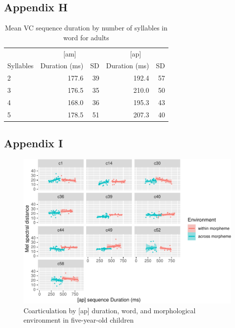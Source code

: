 \documentclass[
]{article}
\begin{document}
\hypertarget{appendix-h}{%
\subsection{Appendix H}\label{appendix-h}}

\begin{table}

\caption{\label{tab:dur-by-syll-adults}Mean VC sequence duration by number of syllables in word for adults}
\centering
\begin{tabular}[t]{lrrrr}
\toprule
\multicolumn{1}{c}{ } & \multicolumn{2}{c}{[am]} & \multicolumn{2}{c}{[ap]} \\
\cmidrule(l{3pt}r{3pt}){2-3} \cmidrule(l{3pt}r{3pt}){4-5}
Syllables & Duration (ms) & SD  & Duration (ms) & SD\\
\midrule
2 & 177.6 & 39 & 192.4 & 57\\
3 & 176.5 & 35 & 210.0 & 50\\
4 & 168.0 & 36 & 195.3 & 43\\
5 & 178.5 & 51 & 207.3 & 40\\
\bottomrule
\end{tabular}
\end{table}

\hypertarget{appendix-i}{%
\subsection{Appendix I}\label{appendix-i}}

\begin{figure}
\centering
\includegraphics{3_ch3_results_files/figure-latex/five-facet-ap-1.pdf}
\caption{\label{fig:five-facet-ap}Coarticulation by {[}ap{]} duration, word, and morphological environment in five-year-old children}
\end{figure}
\end{document}
